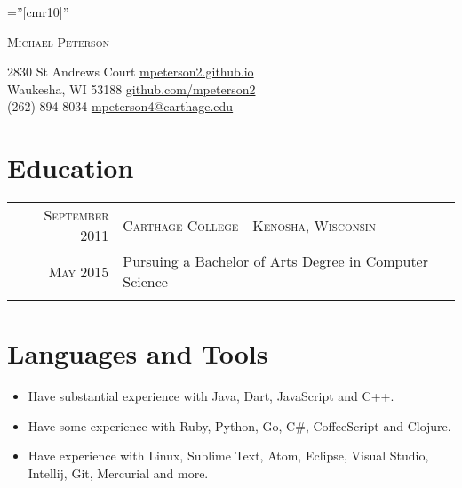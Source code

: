 \documentclass[letterpaper,10pt]{article}
\begin{document}
    \pagestyle{empty} %

    \font\fb=''[cmr10]'' %

    \par{\centering
    		{\Huge \textsc{Michael Peterson}
    	}\bigskip\par}


        2830 St Andrews Court \hfill
        \href{http://mpeterson2.github.io/}{mpeterson2.github.io} \\
        Waukesha, WI 53188 \hfill
        \href{https://github.com/mpeterson2}{github.com/mpeterson2} \\
        (262) 894-8034 \hfill
        \href{mailto:mpeterson4@carthage.edu}{mpeterson4@carthage.edu} \\


    \section{Education}
    \begin{tabular}{r|p{13.9cm}}

     \textsc{September 2011} & \textsc{Carthage College - Kenosha, Wisconsin} \\
     \textsc{May 2015} &
     Pursuing a Bachelor of Arts Degree in Computer Science\\\multicolumn{2}{c}{}\\

    \end{tabular}

    \section{Languages and Tools}
      \begin{itemize}
        \item Have substantial experience with Java, Dart, JavaScript and C++.
        \item Have some experience with Ruby, Python, Go, C\#, CoffeeScript and Clojure.
        \item Have experience with Linux, Sublime Text, Atom, Eclipse, Visual Studio, Intellij, Git, Mercurial and more.
      \end{itemize}
\end{document}
